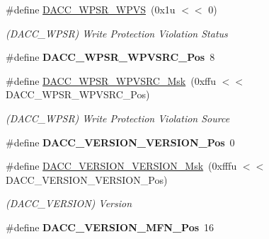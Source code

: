 \begin{DoxyCompactItemize}
\mbox{\label{group__SAMV71__DACC_ga5ae2d17379a2528900c8084440ee66a3}} 
\#define \mbox{\hyperlink{group__SAMV71__DACC_ga5ae2d17379a2528900c8084440ee66a3}{D\+A\+C\+C\+\_\+\+W\+P\+S\+R\+\_\+\+W\+P\+VS}}~(0x1u $<$$<$ 0)
\begin{DoxyCompactList}\small\item\em (D\+A\+C\+C\+\_\+\+W\+P\+SR) Write Protection Violation Status \end{DoxyCompactList}\item 
\mbox{\label{group__SAMV71__DACC_ga4ef4dcc3bf2e023b9638d70b2c13e727}} 
\#define {\bfseries D\+A\+C\+C\+\_\+\+W\+P\+S\+R\+\_\+\+W\+P\+V\+S\+R\+C\+\_\+\+Pos}~8
\item 
\mbox{\label{group__SAMV71__DACC_gaec9589b916ff63d79b578e7b3d8f2af9}} 
\#define \mbox{\hyperlink{group__SAMV71__DACC_gaec9589b916ff63d79b578e7b3d8f2af9}{D\+A\+C\+C\+\_\+\+W\+P\+S\+R\+\_\+\+W\+P\+V\+S\+R\+C\+\_\+\+Msk}}~(0xffu $<$$<$ D\+A\+C\+C\+\_\+\+W\+P\+S\+R\+\_\+\+W\+P\+V\+S\+R\+C\+\_\+\+Pos)
\begin{DoxyCompactList}\small\item\em (D\+A\+C\+C\+\_\+\+W\+P\+SR) Write Protection Violation Source \end{DoxyCompactList}\item 
\mbox{\label{group__SAMV71__DACC_ga14d65fa1c7096453741335b5937dbaae}} 
\#define {\bfseries D\+A\+C\+C\+\_\+\+V\+E\+R\+S\+I\+O\+N\+\_\+\+V\+E\+R\+S\+I\+O\+N\+\_\+\+Pos}~0
\item 
\mbox{\label{group__SAMV71__DACC_gad409d4010123c06293defd2f64b6a851}} 
\#define \mbox{\hyperlink{group__SAMV71__DACC_gad409d4010123c06293defd2f64b6a851}{D\+A\+C\+C\+\_\+\+V\+E\+R\+S\+I\+O\+N\+\_\+\+V\+E\+R\+S\+I\+O\+N\+\_\+\+Msk}}~(0xfffu $<$$<$ D\+A\+C\+C\+\_\+\+V\+E\+R\+S\+I\+O\+N\+\_\+\+V\+E\+R\+S\+I\+O\+N\+\_\+\+Pos)
\begin{DoxyCompactList}\small\item\em (D\+A\+C\+C\+\_\+\+V\+E\+R\+S\+I\+ON) Version \end{DoxyCompactList}\item 
\mbox{\label{group__SAMV71__DACC_ga1e81a8747bf38a36c36d7e63f5ced4fa}} 
\#define {\bfseries D\+A\+C\+C\+\_\+\+V\+E\+R\+S\+I\+O\+N\+\_\+\+M\+F\+N\+\_\+\+Pos}~16
$$
\end{DoxyCompactItemize}
